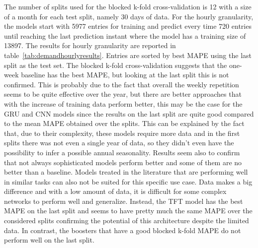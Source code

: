 The number of splits used for the blocked k-fold cross-validation is 12 with a size of a month for each test split, namely 30 days of data.
For the hourly granularity, the models start with 5977 entries for training and predict every time 720 entries until reaching the last prediction instant where the model has a training size of 13897.
The results for hourly granularity are reported in table~\ref{tab:demandhourlyresults}.
Entries are sorted by best MAPE using the last split as the test set.
The blocked k-fold cross-validation suggests that the one-week baseline has the best MAPE, but looking at the last split this is not confirmed.
This is probably due to the fact that overall the weekly repetition seems to be quite effective over the year, but there are better approaches that with the increase of training data perform better, this may be the case for the GRU and CNN models since the results on the last split are quite good compared to the mean MAPE obtained over the splits.
This can be explained by the fact that, due to their complexity, these models require more data and in the first splits there was not even a single year of data, so they didn't even have the possibility to infer a possible annual seasonality.
Results seem also to confirm that not always sophisticated models perform better and some of them are no better than a baseline.
Models treated in the literature that are performing well in similar tasks can also not be suited for this specific use case.
Data makes a big difference and with a low amount of data, it is difficult for some complex networks to perform well and generalize.
Instead, the TFT model has the best MAPE on the last split and seems to have pretty much the same MAPE over the considered splits confirming the potential of this architecture despite the limited data.
In contrast, the boosters that have a good blocked k-fold MAPE do not perform well on the last split.

